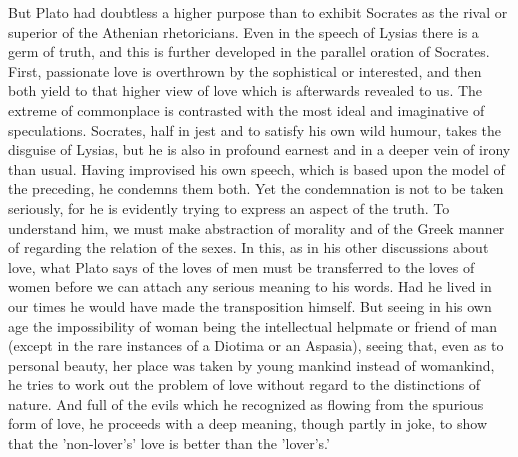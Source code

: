 \documentclass[11pt,letter]{article}
\begin{document}
\par  But Plato had doubtless a higher purpose than to exhibit Socrates as the rival or superior of the Athenian rhetoricians. Even in the speech of Lysias there is a germ of truth, and this is further developed in the parallel oration of Socrates. First, passionate love is overthrown by the sophistical or interested, and then both yield to that higher view of love which is afterwards revealed to us. The extreme of commonplace is contrasted with the most ideal and imaginative of speculations. Socrates, half in jest and to satisfy his own wild humour, takes the disguise of Lysias, but he is also in profound earnest and in a deeper vein of irony than usual. Having improvised his own speech, which is based upon the model of the preceding, he condemns them both. Yet the condemnation is not to be taken seriously, for he is evidently trying to express an aspect of the truth. To understand him, we must make abstraction of morality and of the Greek manner of regarding the relation of the sexes. In this, as in his other discussions about love, what Plato says of the loves of men must be transferred to the loves of women before we can attach any serious meaning to his words. Had he lived in our times he would have made the transposition himself. But seeing in his own age the impossibility of woman being the intellectual helpmate or friend of man (except in the rare instances of a Diotima or an Aspasia), seeing that, even as to personal beauty, her place was taken by young mankind instead of womankind, he tries to work out the problem of love without regard to the distinctions of nature. And full of the evils which he recognized as flowing from the spurious form of love, he proceeds with a deep meaning, though partly in joke, to show that the 'non-lover's' love is better than the 'lover's.'
\end{document}
